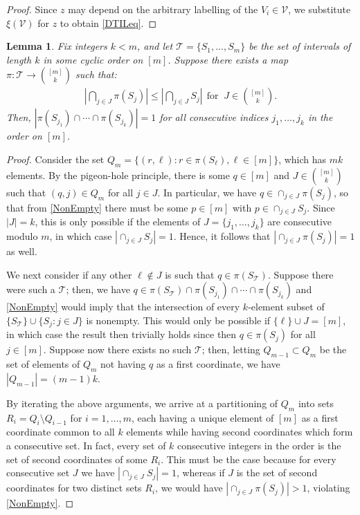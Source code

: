\documentclass[journal, twocolumn]{IEEEtran}
\newtheorem{lemma}{Lemma}
\begin{document}
\begin{proof}
Since $z$ may depend on the arbitrary labelling of the $V_i \in \mathcal{V}$, we substitute $\xi(\mathcal{V})$ for $z$ to obtain \eqref{DTILeq}.
\end{proof}


\begin{lemma}\label{NonEmptyLemma} Fix integers $k < m$, and let $\mathcal{T} = \{S_1, \ldots, S_m\}$ be the set of intervals of length $k$ in some cyclic order on $[m]$. Suppose there exists a map $\pi: \mathcal{T} \to {[m] \choose k}$ such that:
\begin{align}\label{NonEmpty}
|\bigcap_{j \in J} \pi(S_j)| \leq |\bigcap_{j \in J} S_j | \ \ \text{for } \ J \in {[m] \choose k}.
\end{align}
%
Then, $|\pi(S_{j_1}) \cap \cdots \cap \pi(S_{j_k})| = 1$ for all consecutive indices $j_1,\ldots,j_k$ in the order on $[m]$.
\end{lemma}

\begin{proof} Consider the set $Q_m = \{ (r,\ell) : r \in \pi(S_{\ell}), \ell \in [m] \}$, which has $mk$ elements. By the pigeon-hole principle, there is some $q \in [m]$ and $J \in {[m] \choose k}$ such that $(q, j) \in Q_m$ for all $j \in J$. In particular, we have $q \in \cap_{j \in J} \pi(S_j)$, so that from \eqref{NonEmpty} there must be some $p \in [m]$ with $p \in \cap_{j \in J} S_j$. Since $|J| = k$, this is only possible if the elements of $J = \{j_1, \ldots, j_k\}$ are consecutive modulo $m$, in which case $|\cap_{j \in J} S_j| = 1$. Hence, it follows that $|\cap_{j \in J} \pi(S_j)| = 1$ as well.

We next consider if any other $\ell \notin J$ is such that $q \in \pi(S_\mathcal{T})$. Suppose there were such a $\mathcal{T}$; then, we have \mbox{$q \in \pi(S_\mathcal{T}) \cap \pi(S_{j_1}) \cap \cdots \cap \pi(S_{j_k})$} and \eqref{NonEmpty} would imply that the intersection of every $k$-element subset of $\{S_\mathcal{T}\} \cup \{S_j: j \in J\}$ is nonempty. This would only be possible if $\{\ell\} \cup J = [m]$, in which case the result then trivially holds since then $q \in \pi(S_j)$ for all $j \in [m]$.  Suppose now there exists no such $\mathcal{T}$; then, letting $Q_{m-1} \subset Q_m$ be the set of elements of $Q_m$ not having $q$ as a first coordinate, we have $|Q_{m-1}| = (m-1)k$. 

By iterating the above arguments, we arrive at a partitioning of $Q_m$ into sets $R_i = Q_i \setminus Q_{i-1}$ for $i = 1, \ldots, m$, each having a unique element of $[m]$ as a first coordinate common to all $k$ elements while having second coordinates which form a consecutive set. In fact, every set of $k$ consecutive integers in the order is the set of second coordinates of some $R_i$. This must be the case because for every consecutive set $J$ we have $|\cap_{j \in J} S_j| = 1$, whereas if $J$ is the set of second coordinates for two distinct sets $R_i$, we would have \mbox{$|\cap_{j \in J} \pi(S_j)| > 1$}, violating \eqref{NonEmpty}. 
\end{proof}
\end{document}
